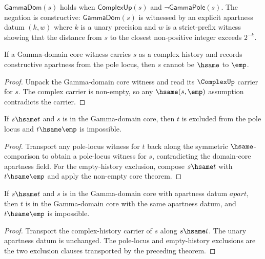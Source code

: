 \begin{definition}
\label{def:gamma-domain}
\(\mathsf{GammaDom}(s)\) holds when \(\mathsf{ComplexUp}(s)\) and \(\neg \mathsf{GammaPole}(s)\). The negation is constructive: \(\mathsf{GammaDom}(s)\) is witnessed by an explicit apartness datum \((k, w)\) where \(k\) is a unary precision and \(w\) is a strict-prefix witness showing that the distance from \(s\) to the closest non-positive integer exceeds \(2^{-k}\).
\end{definition}

\begin{theorem}
\label{thm:gamma-domain-core-not-empty}
If a Gamma-domain core witness carries \(s\) as a complex history and records
constructive apartness from the pole locus, then \(s\) cannot be \(\hsame\) to
\(\emp\).
\end{theorem}
\begin{proof}
Unpack the Gamma-domain core witness and read its \(\ComplexUp\) carrier for
\(s\). The complex carrier is non-empty, so any \(\hsame(s,\emp)\) assumption
contradicts the carrier.
\end{proof}

\begin{theorem}
\label{thm:gamma-domain-core-hsame-transport-exclusions}
If \(s\hsame t\) and \(s\) is in the Gamma-domain core, then \(t\) is excluded
from the pole locus and \(t\hsame\emp\) is impossible.
\end{theorem}
\begin{proof}
Transport any pole-locus witness for \(t\) back along the symmetric
\(\hsame\)-comparison to obtain a pole-locus witness for \(s\), contradicting
the domain-core apartness field. For the empty-history exclusion, compose
\(s\hsame t\) with \(t\hsame\emp\) and apply the non-empty core theorem.
\end{proof}

\begin{theorem}
\label{thm:gamma-domain-core-hsame-transport}
If \(s\hsame t\) and \(s\) is in the Gamma-domain core with apartness datum
\(apart\), then \(t\) is in the Gamma-domain core with the same apartness datum,
and \(t\hsame\emp\) is impossible.
\end{theorem}
\begin{proof}
Transport the complex-history carrier of \(s\) along \(s\hsame t\). The unary
apartness datum is unchanged. The pole-locus and empty-history exclusions are
the two exclusion clauses transported by the preceding theorem.
\end{proof}

